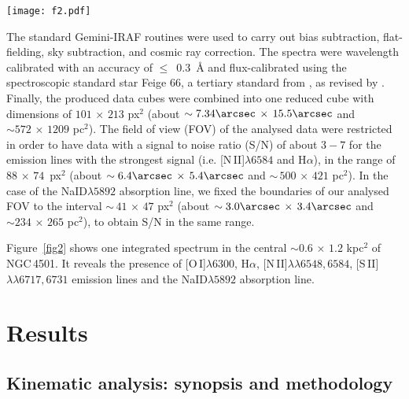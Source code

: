 \documentclass[fleqn,usenatbib]{mnras}
\begin{document}
\begin{figure*}
\texttt{[image: f2.pdf]}
\caption{The nuclear spectrum of NGC4501, displayed in units of 
$10^{-16}$ erg sec$^{-1}$cm$^{-2}$\AA$^{-1}$, with the emission and absorption lines marked. 
The kinematic maps were derived for the strongest emission lines 
\hbox{[N\,II]$\lambda6584$}, H$\alpha$, and also for the absorption Sodium line.}
\label{fig2}
\end{figure*}

The standard Gemini-IRAF routines were used to carry out bias subtraction, flat-fielding, sky subtraction, and cosmic ray correction. 
The spectra were wavelength calibrated with an accuracy of \mbox{$\leqslant$ 0.3 \AA} and flux-calibrated using the spectroscopic standard star Feige 66, a tertiary standard 
from \citet{Baldwin1984}, as revised by \citet{Hamuy1992}. Finally, the produced data cubes were combined into one reduced cube with dimensions of $101\,\times\,213$ px$^2$ 
(about $\sim 7.34\arcsec\,\times\, 15.5\arcsec$ and $\sim 572\, \times\,1209$ pc$^2$). 
The field of view (FOV) of the analysed data were restricted in order to  have data with a signal to noise ratio (S/N) of about $3-7$ for the emission lines with the strongest 
signal (i.e. \hbox{[N\,II]$\lambda6584$} and H$\alpha$), in the range of \mbox{$88\,\times\,74$ px$^2$} (about $\sim 6.4\arcsec\,\times\,5.4\arcsec$ and $\sim\,500\,\times\,421$ pc$^2$). 
In the case of the NaID$\lambda5892$ absorption line, we fixed the boundaries of our analysed FOV to the interval $\sim\,41\,\times\,47$ px$^2$ (about $\sim3.0\arcsec\,\times\,
3.4\arcsec$ and $\sim 234\,\times\,265$ pc$^2$), to obtain S/N in the same range. 

Figure~\ref{fig2} shows one integrated spectrum in the central $\sim 0.6\,\times\,1.2$ kpc$^2$ of NGC\,4501. It reveals the presence of \hbox{[O\,I]$\lambda6300$}, H$\alpha$, 
\hbox{[N\,II]$\lambda\lambda6548,6584$}, \hbox{[S\,II]$\lambda\lambda6717,6731$} emission lines and the NaID$\lambda5892$ absorption line.

\section{Results}\label{sec:s3}

\subsection{Kinematic analysis: synopsis and methodology}\label{sec:s4}
\end{document}

